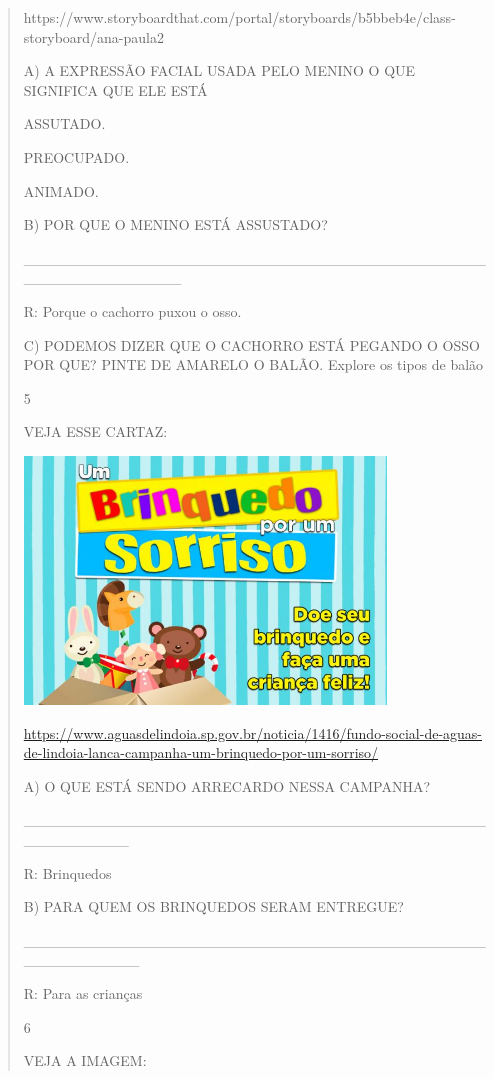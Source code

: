 \begin{verse}
{{{https://www.storyboardthat.com/portal/storyboards/b5bbeb4e/class-storyboard/ana-paula2

A) A EXPRESSÃO FACIAL USADA PELO MENINO O QUE SIGNIFICA QUE ELE ESTÁ

ASSUTADO.

PREOCUPADO.

ANIMADO.

B) POR QUE O MENINO ESTÁ ASSUSTADO?

\_\_\_\_\_\_\_\_\_\_\_\_\_\_\_\_\_\_\_\_\_\_\_\_\_\_\_\_\_\_\_\_\_\_\_\_\_\_\_\_\_\_\_\_\_\_\_\_\_\_\_\_\_\_\_\_\_\_\_

R: Porque o cachorro puxou o osso.

C) PODEMOS DIZER QUE O CACHORRO ESTÁ PEGANDO O OSSO POR QUE? PINTE DE
AMARELO O BALÃO. Explore os tipos de balão

\num{5}

VEJA ESSE CARTAZ:

\includegraphics[width=3.78169in,height=2.59560in]{media/image132.jpeg}

\url{https://www.aguasdelindoia.sp.gov.br/noticia/1416/fundo-social-de-aguas-de-lindoia-lanca-campanha-um-brinquedo-por-um-sorriso/}

A) O QUE ESTÁ SENDO ARRECARDO NESSA CAMPANHA?

\_\_\_\_\_\_\_\_\_\_\_\_\_\_\_\_\_\_\_\_\_\_\_\_\_\_\_\_\_\_\_\_\_\_\_\_\_\_\_\_\_\_\_\_\_\_\_\_\_\_\_\_\_\_

R: Brinquedos

B) PARA QUEM OS BRINQUEDOS SERAM ENTREGUE?

\_\_\_\_\_\_\_\_\_\_\_\_\_\_\_\_\_\_\_\_\_\_\_\_\_\_\_\_\_\_\_\_\_\_\_\_\_\_\_\_\_\_\_\_\_\_\_\_\_\_\_\_\_\_\_

R: Para as crianças

\num{6}

VEJA A IMAGEM:

}}}
\end{verse}
